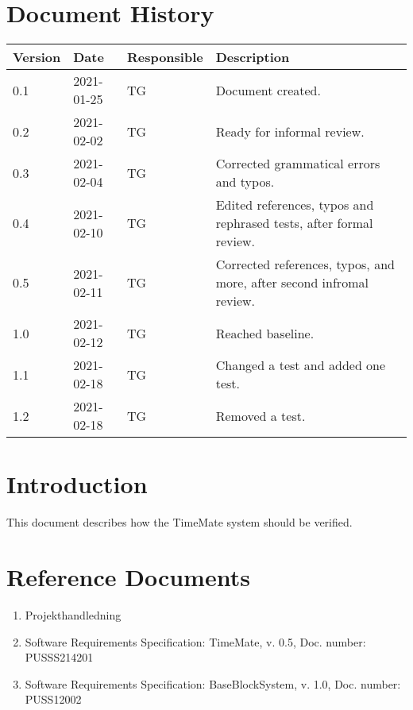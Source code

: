 \documentclass{article}
\date {#1}
\title {
    \documentNumber {02}    
    
    \documentVersion {1.2}
    
    \documentTitle {Software Verification and Validation Specification}
    \documentGroup {2}
    
    \documentResponsible {Test Group}
    \documentAuthors {Test Group}
    
    \documentDate {2021-02-18}
}
\begin{document}
\maketitle
\thispagestyle{empty}

\newpage

\tableofcontents

\newpage



\section{Document History}
\begin{tabular}{ l | l | l | l }
    Version & Date & Responsible & Description \\
    \hline
    0.1 & 2021-01-25 & TG & Document created. \\
    0.2 & 2021-02-02 & TG & Ready for informal review. \\
    0.3 & 2021-02-04 & TG & Corrected grammatical errors and typos. \\
    0.4 & 2021-02-10 & TG & Edited references, typos and rephrased tests, after formal review. \\
    0.5 & 2021-02-11 & TG & Corrected references, typos, and more, after second infromal review. \\
	1.0 & 2021-02-12 & TG & Reached baseline. \\
	1.1 & 2021-02-18 & TG & Changed a test and added one test. \\
	1.2 & 2021-02-18 & TG & Removed a test. \\
\end{tabular}

\section{Introduction}

	This document describes how the TimeMate system should be verified. 

\section{Reference Documents}

\begin{enumerate}
  \item Projekthandledning 
  \item Software Requirements Specification: TimeMate, v. 0.5, Doc. number: PUSSS214201
  \item Software Requirements Specification: BaseBlockSystem, v. 1.0, Doc. number: PUSS12002

\end{enumerate}
\end{document}
